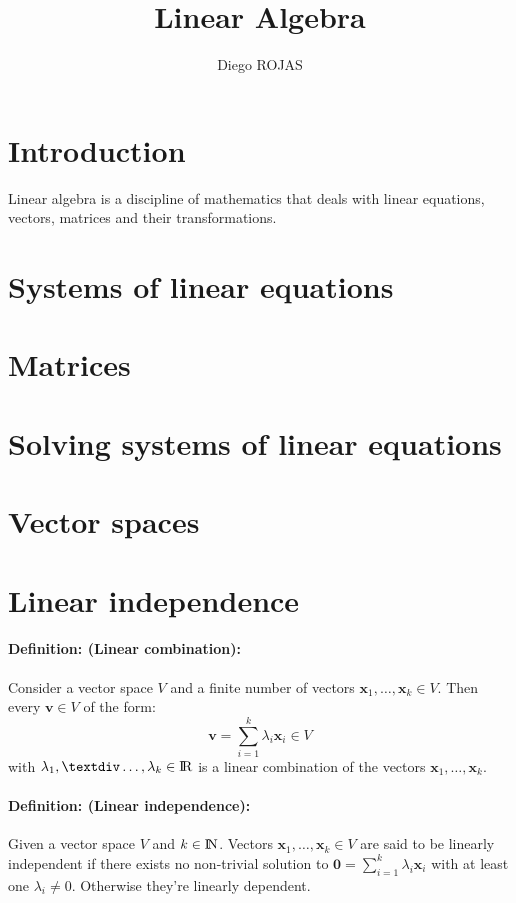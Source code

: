 \documentclass[12pt]{article}
\title{Linear Algebra}
\author{Diego ROJAS}
\newcommand{\R}{{\rm I\!R}}
\newcommand{\N}{{\rm I\!N}}
\newcommand{\bx}{{\bm{x}}}
\newcommand{\xdefinition}[2]{\paragraph{\colorbox{#1!30}{\textbf{Definition:}} (#2):}}
\begin{document}
\maketitle

\section{Introduction}

Linear algebra is a discipline of mathematics that deals with linear equations, vectors, matrices and their transformations.

\section{Systems of linear equations}

\section{Matrices}

\section{Solving systems of linear equations}

\section{Vector spaces}

\section{Linear independence}

\xdefinition{red}{Linear combination} Consider a vector space $V$ and a finite number of vectors $\bx_1, \dots, \bx_k \in V$. Then every $\bm{v} \in V$ of the form:
%
	\begin{equation}
		\bm{v} = \sum\limits_{i=1}^{k} \lambda_i \bm{x}_i \in V
	\end{equation}
%
	with $\lambda_1, ÷\dots, \lambda_k \in \R$ is a linear combination of the vectors $\bx_1, \dots, \bx_k$.

\xdefinition{red}{Linear independence} Given a vector space $V$ and $k \in \N$. Vectors $\bx_1, \dots, \bx_k \in V$ are said to be linearly independent if there exists no non-trivial solution to $\bm{0} = \sum\nolimits_{i=1}^{k} \lambda_i \bx_i$ with at least one $\lambda_i \neq 0$. Otherwise they're linearly dependent.
\end{document}
